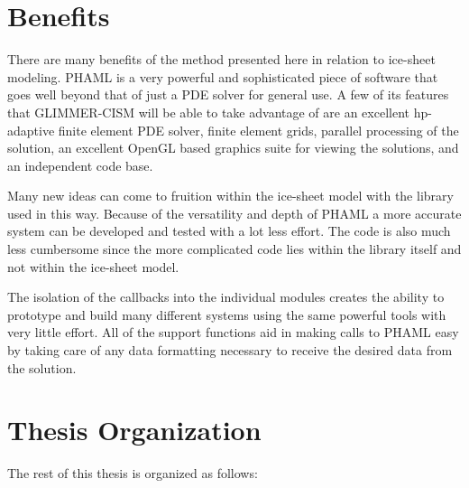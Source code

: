 \section{Benefits}\label{sec:chp1benefits}

There are many benefits of the method presented here in relation to ice-sheet modeling.  PHAML is a very powerful and sophisticated piece of software that goes well beyond that of just a PDE solver for general use.  A few of its features that GLIMMER-CISM will be able to take advantage of are an excellent hp-adaptive finite element PDE solver, finite element grids, parallel processing of the solution, an excellent OpenGL based graphics suite for viewing the solutions, and an independent code base.%

Many new ideas can come to fruition within the ice-sheet model with the library used in this way.  Because of the versatility and depth of PHAML a more accurate system can be developed and tested with a lot less effort.  The code is also much less cumbersome since the more complicated code lies within the library itself and not within the ice-sheet model.

The isolation of the callbacks into the individual modules creates the ability to prototype and build many different systems using the same powerful tools with very little effort.  All of the support functions aid in making calls to PHAML easy by taking care of any data formatting necessary to receive the desired data from the solution.


\newpage

\section{Thesis Organization}\label{sec:chp1organization}

The rest of this thesis is organized as follows:

